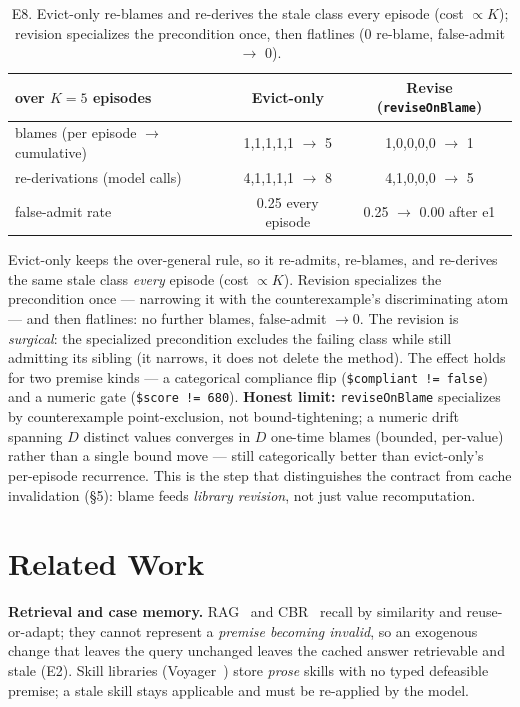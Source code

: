 \documentclass[11pt]{article}
\begin{document}
\begin{table}[h]\centering
\begin{tabular}{lcc}
\toprule
over $K=5$ episodes & Evict-only & Revise (\texttt{reviseOnBlame}) \\
\midrule
blames (per episode $\to$ cumulative) & 1,1,1,1,1 $\to$ 5 & 1,0,0,0,0 $\to$ 1 \\
re-derivations (model calls) & 4,1,1,1,1 $\to$ 8 & 4,1,0,0,0 $\to$ 5 \\
false-admit rate & 0.25 every episode & 0.25 $\to$ 0.00 after e1 \\
\bottomrule
\end{tabular}
\caption{E8. Evict-only re-blames and re-derives the stale class every episode (cost $\propto K$); revision specializes the precondition once, then flatlines (0 re-blame, false-admit $\to$ 0).}
\label{tab:e8}
\end{table}

Evict-only keeps the over-general rule, so it re-admits, re-blames, and re-derives the same stale class \emph{every}
episode (cost $\propto K$). Revision specializes the precondition once --- narrowing it with the counterexample's
discriminating atom --- and then flatlines: no further blames, false-admit $\to 0$. The revision is \emph{surgical}:
the specialized precondition excludes the failing class while still admitting its sibling (it narrows, it does not
delete the method). The effect holds for two premise kinds --- a categorical compliance flip
(\texttt{\$compliant != false}) and a numeric gate (\texttt{\$score != 680}). \textbf{Honest limit:}
\texttt{reviseOnBlame} specializes by counterexample point-exclusion, not bound-tightening; a numeric drift spanning
$D$ distinct values converges in $D$ one-time blames (bounded, per-value) rather than a single bound move --- still
categorically better than evict-only's per-episode recurrence. This is the step that distinguishes the contract from
cache invalidation (\S5): blame feeds \emph{library revision}, not just value recomputation.

\section{Related Work}
\textbf{Retrieval and case memory.} RAG~\cite{lewis2020} and CBR~\cite{aamodt1994} recall by similarity and reuse-or-adapt; they
cannot represent a \emph{premise becoming invalid}, so an exogenous change that leaves the query unchanged leaves the
cached answer retrievable and stale (E2). Skill libraries (Voyager~\cite{wang2023}) store \emph{prose} skills with no
typed defeasible premise; a stale skill stays applicable and must be re-applied by the model.
\end{document}
